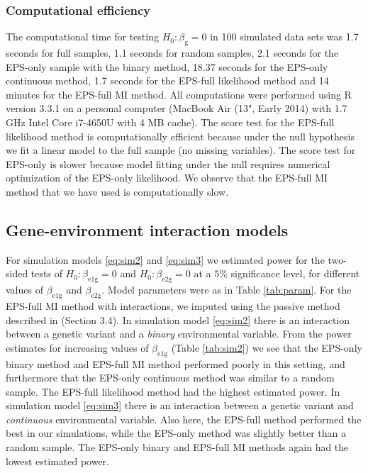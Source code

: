 \documentclass[10pt,a4paper]{article}
\begin{document}
\subsubsection{Computational efficiency}
The computational time for testing $H_0: \beta_{\text{g}} = 0$ in 100 simulated data sets was 1.7 seconds for full samples, 1.1 seconds for random samples, 2.1 seconds for the EPS-only sample with the binary method, 18.37 seconds for the EPS-only continuous method, 1.7 seconds for the EPS-full likelihood method and 14 minutes for the EPS-full MI method. All computations were performed using R version 3.3.1 \citep{Rsoftware} on a personal computer (MacBook Air (13", Early 2014) with 1.7 GHz Intel Core i7-4650U with 4 MB cache). The score test for the EPS-full likelihood method is computationally efficient because under the null hypothesis we fit a linear model to the full sample (no missing variables). The score test for EPS-only is slower because model fitting under the null requires numerical optimization of the EPS-only likelihood. We observe that the EPS-full MI method that we have used is computationally slow.

\subsection{Gene-environment interaction models}
For simulation models \eqref{eq:sim2} and \eqref{eq:sim3} we estimated power for the two-sided tests of $H_0: \beta_{\text{e}1\text{g}} = 0$ and $H_0: \beta_{\text{e}2\text{g}} = 0$ at a $5\%$ significance level, for different values of $\beta_{\text{e}1\text{g}}$ and $\beta_{\text{e}2\text{g}}$. Model parameters were as in Table \ref{tab:param}. For the EPS-full MI method with interactions, we imputed using the passive method described in \cite{buuren2011mice} (Section 3.4). In simulation model \eqref{eq:sim2} there is an interaction between a genetic variant and a \textit{binary} environmental variable. From the power estimates for increasing values of $\beta_{\text{e}1\text{g}}$ (Table \ref{tab:sim2}) we see that the EPS-only binary method and EPS-full MI method performed poorly in this setting, and furthermore that the EPS-only continuous method was similar to a random sample. The EPS-full likelihood method had the highest estimated power. In simulation model \eqref{eq:sim3} there is an interaction between a genetic variant and \textit{continuous} environmental variable. Also here, the EPS-full method performed the best in our simulations, while the EPS-only method was slightly better than a random sample. The EPS-only binary and EPS-full MI methods again had the lowest estimated power.
\end{document}
